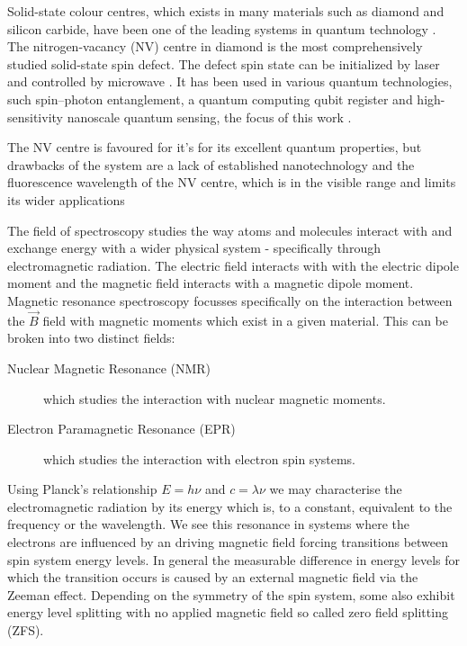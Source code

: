 Solid-state colour centres, which exists in many materials such as diamond and silicon carbide, have been one of the leading systems in quantum technology
\cite{Son2020, Awschalom2018}. 
The nitrogen-vacancy (NV) centre in diamond is the most comprehensively studied solid-state spin defect. The defect spin state can be initialized by laser and controlled by microwave \cite{Zhang2020, Atatre2018, Schirhagl2014}. It has been used in various quantum technologies, such spin–photon entanglement, a quantum computing qubit register and high-sensitivity nanoscale quantum sensing, the focus of this work \cite{Hensen2015, PhysRevX.9.031045}. 


The NV centre is favoured for it's for its excellent quantum properties, but
drawbacks of the system are a lack of established nanotechnology and the fluorescence wavelength of the NV centre, which is in the visible range and limits its wider applications \cite{Koehl2011, Christle2014, Widmann2014} 


The field of spectroscopy studies the way atoms and molecules interact with and exchange energy with a wider physical system - specifically through electromagnetic radiation. The electric field interacts with with the electric dipole moment and the magnetic field interacts with a magnetic dipole moment.
Magnetic resonance spectroscopy focusses specifically on the interaction between the $\vec{B}$ field with magnetic moments which exist in a given material. This can be broken into two distinct fields:

\begin{description}
	\item [Nuclear Magnetic Resonance (NMR)] which studies the interaction with nuclear magnetic moments.
	\item [Electron Paramagnetic Resonance (EPR)] which studies the interaction with electron spin systems.
\end{description}

Using Planck's relationship $E = h \nu$  and $c = \lambda \nu$ we may characterise the electromagnetic radiation by its energy which is, to a constant, equivalent to the frequency or the wavelength. We see this resonance in systems where the electrons are influenced by an driving magnetic field forcing transitions between spin system energy levels. In general the measurable difference in energy levels for which the transition occurs is caused by an external magnetic field via the Zeeman effect. Depending on the symmetry of the spin system, some also exhibit energy level splitting with no applied magnetic field so called zero field splitting (ZFS).

